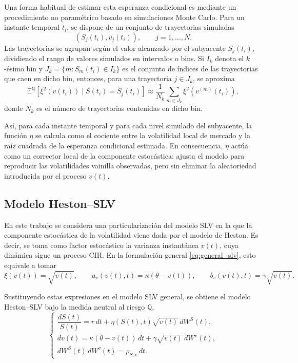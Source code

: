 Una forma habitual de estimar esta esperanza condicional es mediante un procedimiento no paramétrico basado en simulaciones Monte Carlo. Para un instante temporal \(t_i\), se dispone de un conjunto de trayectorias simuladas
\[
\left(S_{j}(t_i),v_{j}(t_i)\right),
\qquad j=1,\ldots,N.
\]
Las trayectorias se agrupan según el valor alcanzado por el subyacente \(S_j(t_i)\), dividiendo el rango de valores simulados en intervalos o bins. Si \(I_k\) denota el \(k\)-ésimo bin y \(J_k=\{m:S_m(t_i)\in I_k\}\) es el conjunto de índices de las trayectorias que caen en dicho bin, entonces, para una trayectoria \(j\in J_k\), se aproxima
\begin{equation}
\label{eq:conditional_expectation_bins_general}
\mathbb{E}^{\mathbb{Q}}
\left[
\xi^2(v(t_i))\mid S(t_i)=S_{j}(t_i)
\right]
\approx
\frac{1}{N_k}
\sum_{m\in J_k}
\xi^2\left(v^{(m)}(t_i)\right),
\end{equation}
donde \(N_k\) es el número de trayectorias contenidas en dicho bin.

Así, para cada instante temporal y para cada nivel simulado del subyacente, la función \(\eta\) se calcula como el cociente entre la volatilidad local de mercado y la raíz cuadrada de la esperanza condicional estimada. En consecuencia, \(\eta\) actúa como un corrector local de la componente estocástica: ajusta el modelo para reproducir las volatilidades vainilla observadas, pero sin eliminar la aleatoriedad introducida por el proceso \(v(t)\).

\subsection{Modelo Heston--SLV}

En este trabajo se considera una particularización del modelo SLV en la que la componente estocástica de la volatilidad viene dada por el modelo de Heston. Es decir, se toma como factor estocástico la varianza instantánea \(v(t)\), cuya dinámica sigue un proceso CIR. En la formulación general \ref{eq:general_slv}, esto equivale a tomar
\[
\xi(v(t))=\sqrt{v(t)},
\qquad
a_v(v(t),t)=\kappa(\theta-v(t)),
\qquad
b_v(v(t),t)=\gamma\sqrt{v(t)}.
\]

Sustituyendo estas expresiones en el modelo SLV general, se obtiene el modelo Heston--SLV bajo la medida neutral al riesgo \(\mathbb{Q}\),
\begin{equation}
\label{eq:heston_slv}
\begin{cases}
\dfrac{dS(t)}{S(t)}
=
r\,dt+\eta(S(t),t)\sqrt{v(t)}\,dW^S(t), \\[0.25cm]
dv(t)
=
\kappa(\theta-v(t))\,dt+\gamma\sqrt{v(t)}\,dW^v(t), \\[0.25cm]
dW^S(t)\,dW^v(t)=\rho_{S,v}\,dt.
\end{cases}
\end{equation}

